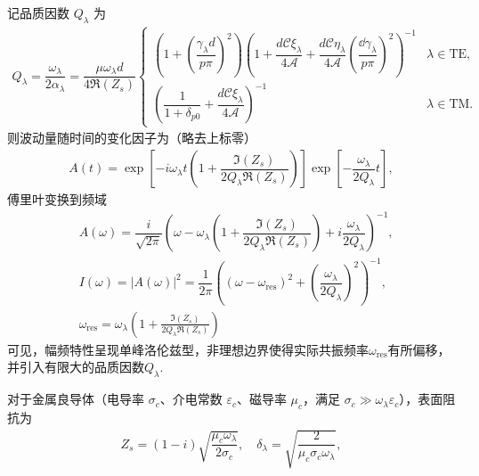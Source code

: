 记品质因数 \(Q_{\lambda}\) 为
\begin{align*}
	Q_{\lambda} = \dfrac{\omega_{\lambda}}{2\alpha_{\lambda}} = \dfrac{\mu \omega_{\lambda} d}{4 \Re(Z_s)} \begin{cases}
		\left( 1 + \left( \dfrac{\gamma_{\lambda} d}{p\pi} \right)^2 \right) \left( 1 + \dfrac{d \mathcal{C} \xi_{\lambda}}{4\mathcal{A}} + \dfrac{d \mathcal{C} \eta_{\lambda}}{4\mathcal{A}} \left( \dfrac{\dd \gamma_{\lambda}}{p\pi} \right)^2 \right)^{-1} & \lambda \in \text{TE}, \\[8pt]
		\left( \dfrac{1}{1+\delta_{p0}} + \dfrac{d \mathcal{C} \xi_{\lambda}}{4\mathcal{A}} \right)^{-1}                                                                                                                                                       & \lambda \in \text{TM}.
	\end{cases}
\end{align*}
则波动量随时间的变化因子为（略去上标零）
\begin{align*}
	A(t) = \exp\left[-i\omega_{\lambda} t \left( 1 + \dfrac{\Im(Z_s)}{2 Q_{\lambda}\Re(Z_s)} \right)\right] \exp\left[-\dfrac{\omega_{\lambda}}{2 Q_{\lambda}} t\right],
\end{align*}
傅里叶变换到频域
\begin{align*}
	&A(\omega) = \dfrac{i}{\sqrt{2\pi}} \left( \omega - \omega_{\lambda} \left( 1 + \dfrac{\Im(Z_s)}{2 Q_{\lambda}\Re(Z_s)} \right) + i \dfrac{\omega_{\lambda}}{2 Q_{\lambda}} \right)^{-1},\\
	&I(\omega) = |A(\omega)|^2 = \dfrac{1}{2\pi} \left( \left( \omega - \omega_{\text{res}} \right)^2 + \left( \dfrac{\omega_{\lambda}}{2 Q_{\lambda}} \right)^2 \right)^{-1},\\
	&\omega_{\text{res}} = \omega_{\lambda} \left( 1 + \frac{\Im (Z_s)}{2 Q_{\lambda}\Re (Z_s)} \right)
\end{align*}
可见，幅频特性呈现单峰洛伦兹型，非理想边界使得实际共振频率\(\omega_{\text{res}}\)有所偏移，并引入有限大的品质因数\(Q_{\lambda}\).

对于金属良导体（电导率 \(\sigma_c\)、介电常数 \(\varepsilon_c\)、磁导率 \(\mu_c\)，满足 \(\sigma_c \gg \omega_{\lambda} \varepsilon_c\)），表面阻抗为
\begin{align*}
	Z_s = (1-i) \sqrt{\dfrac{\mu_c \omega_{\lambda}}{2\sigma_c}}, \quad \delta_{\lambda} = \sqrt{\dfrac{2}{\mu_c \sigma_c \omega_{\lambda}}},
\end{align*}

